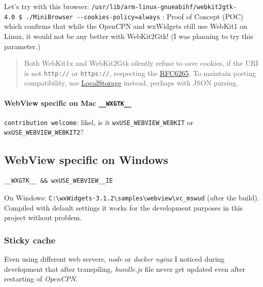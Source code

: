 \documentclass[11pt]{article}
\begin{document}
    Let's try with this browser:
\texttt{/usr/lib/arm-linux-gnueabihf/webkit2gtk-4.0\ \$\ ./MiniBrowser\ -\/-cookies-policy=always}
: Proof of Concept (POC) which confirms that while the OpenCPN and
wxWidgets still use WebKit1 on Linux, it would not be any better with
WebKit2Gtk! (I was planning to try this parameter.)

    \begin{quote}
Both WebKit1x and WebKit2Gtk silently refuse to save cookies, if the URI
is not \texttt{http://} or \texttt{https://}, respecting the
\href{https://tools.ietf.org/html/rfc6265}{RFC6265}. To maintain porting
compatibility, use
\href{https://developer.mozilla.org/en-US/docs/Web/API/Window/localStorage}{LocalStorage}
instead, perhaps with JSON parsing.
\end{quote}

    \hypertarget{webview-specific-on-mac-__wxgtk__}{%
\paragraph{\texorpdfstring{WebView specific on Mac
\texttt{\_\_WXGTK\_\_}}{WebView specific on Mac \_\_WXGTK\_\_}}\label{webview-specific-on-mac-__wxgtk__}}

    \texttt{contribution\ welcome}: likel, is it
\texttt{wxUSE\_WEBVIEW\_WEBKIT} or \texttt{wxUSE\_WEBVIEW\_WEBKIT2}?

    \hypertarget{webview-specific-on-windows}{%
\subsection{WebView specific on
Windows}\label{webview-specific-on-windows}}

    \begin{verbatim}
__WXGTK__ && wxUSE_WEBVIEW__IE
\end{verbatim}

    On Windows:
\texttt{C:\textbackslash{}wxWidgets-3.1.2\textbackslash{}samples\textbackslash{}webview\textbackslash{}vc\_mswud}
(after the build). Compiled with default settings it works for the
development purposes in this project without problem.

    \hypertarget{sticky-cache}{%
\subsubsection{Sticky cache}\label{sticky-cache}}

    Even using different web servers, \emph{node} or \emph{docker nginx} I
noticed during development that after transpiling, \emph{bundle.js} file
never get updated even after restarting of \emph{OpenCPN}.
\end{document}
